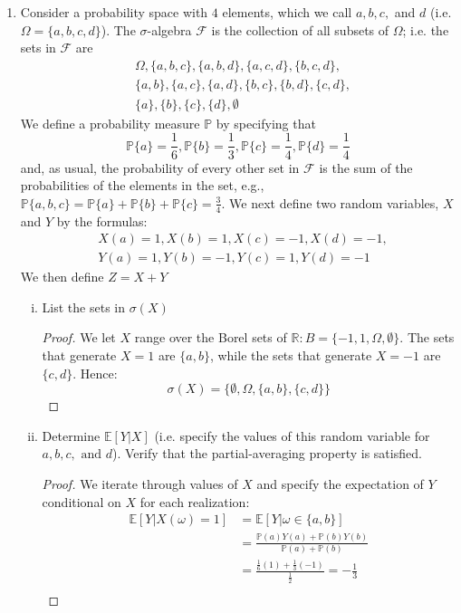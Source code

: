 \documentclass{article}
\makeatletter
\newcommand{\p}{\mathbb{P}}
\newcommand{\R}{\mathbb{R}}
\newcommand{\E}{\mathbb{E}}
\newcommand{\F}{\mathcal{F}}
\newcommand{\Om}{\Omega}
\newcommand{\mylabel}[2]{#2\def\@currentlabel{#2}\label{#1}}
\newcommand{\pr}[1]{ \item[\mylabel{}{#1.}]}
\newcommand{\seq}[1]{\{ #1 \}}
\theoremstyle{definition}
\theoremstyle{definition}
\makeatother
\begin{document}
\begin{enumerate}
    \pr{2.6} Consider a probability space with $4$ elements, which we call $a,b,c,$ and $d$ (i.e. $\Omega = \seq{a,b,c,d}$). The $\sigma$-algebra $\F$ is the collection of all subsets of $\Om$; i.e. the sets in $\F$ are
\begin{align*}
    & \Omega,  \seq{a,b,c}, \seq{a,b,d}, \seq{a,c,d}, \seq{b,c,d},\\
    & \seq{a,b}, \seq{a,c}, \seq{a,d}, \seq{b,c}, \seq{b,d}, \seq{c,d}, \\
    & \seq{a},\seq{b}, \seq{c}, \seq{d}, \emptyset
\end{align*}
We define a probability measure $\p$ by specifying that 
$$ \p\seq{a} = \frac{1}{6}, \p\seq{b} = \frac{1}{3} , \p\seq{c} = \frac{1}{4}, \p\seq{d} = \frac{1}{4}$$ and, as usual, the probability of every other set in $\F$ is the sum of the probabilities of the elements in the set, e.g., $\p\seq{a,b,c} = \p\seq{a}+\p\seq{b}+\p\seq{c} = \frac{3}{4}$. We next define two random variables, $X$ and $Y$ by the formulas:
\begin{align*}
    & X(a) = 1, X(b) = 1 , X(c) = -1, X(d)=-1, \\
    & Y(a) = 1, Y(b) = -1, Y(c) =  1, Y(d) = -1
\end{align*}
We then define $Z = X+Y$
    \begin{enumerate}[(i)]
        \item List the sets in $\sigma(X)$
        \begin{proof}
        We let $X$ range over the Borel sets of $\R:B=\{-1,1,\Omega,\emptyset\}$. The sets that generate $X=1$ are $\seq{a,b}$, while the sets that generate $X=-1$ are $\seq{c,d}$. Hence: $$\sigma(X) = \seq{\emptyset,\Omega,\seq{a,b},\seq{c,d}}$$
        \end{proof}
        \item Determine $\E[Y|X]$ (i.e. specify the values of this random variable for $a,b,c, \text{ and } d$). Verify that the partial-averaging property is satisfied.
        \begin{proof} We iterate through values of $X$ and specify the expectation of $Y$ conditional on $X$ for each realization: 
        \begin{align*}
            \E[Y|X(\omega)=1] &= \E[Y| \omega \in \seq{a,b}]  \\
                            & = \frac{\p(a) Y(a) + \p(b) Y(b)}{\p(a)+\p(b)} \\
                            &= \frac{\frac{1}{6} (1) + \frac{1}{3}(-1)}{\frac{1}{2}} = -\frac{1}{3} \\ 

\end{align*}
\end{proof}
\end{enumerate}
\end{enumerate}
\end{document}
